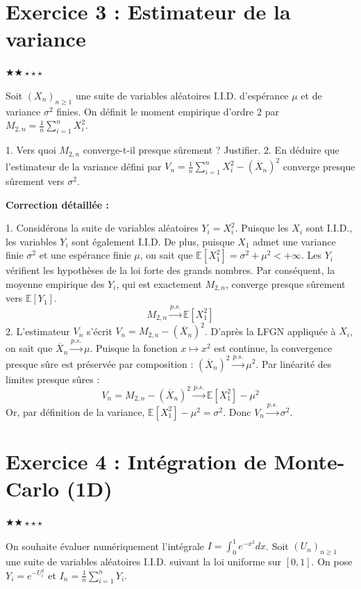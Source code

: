 \documentclass[11pt,a4paper]{article}
\begin{document}
\section*{Exercice 3 : Estimateur de la variance}

$\bigstar\bigstar\star\star\star$

Soit $(X_n)_{n \geq 1}$ une suite de variables aléatoires I.I.D. d'espérance $\mu$ et de variance $\sigma^2$ finies.
On définit le moment empirique d'ordre 2 par $M_{2,n} = \frac{1}{n} \sum_{i=1}^n X_i^2$.

1. Vers quoi $M_{2,n}$ converge-t-il presque sûrement ? Justifier.
2. En déduire que l'estimateur de la variance défini par $V_n = \frac{1}{n} \sum_{i=1}^n X_i^2 - (\overline{X}_n)^2$ converge presque sûrement vers $\sigma^2$.

\textbf{Correction détaillée :}

1. Considérons la suite de variables aléatoires $Y_i = X_i^2$.
   Puisque les $X_i$ sont I.I.D., les variables $Y_i$ sont également I.I.D.
   De plus, puisque $X_1$ admet une variance finie $\sigma^2$ et une espérance finie $\mu$, on sait que $\mathbb{E}[X_1^2] = \sigma^2 + \mu^2 < +\infty$.
   Les $Y_i$ vérifient les hypothèses de la loi forte des grands nombres.
   Par conséquent, la moyenne empirique des $Y_i$, qui est exactement $M_{2,n}$, converge presque sûrement vers $\mathbb{E}[Y_1]$.
   $$ M_{2,n} \xrightarrow{p.s.} \mathbb{E}[X_1^2] $$
2. L'estimateur $V_n$ s'écrit $V_n = M_{2,n} - (\overline{X}_n)^2$.
   D'après la LFGN appliquée à $X_i$, on sait que $\overline{X}_n \xrightarrow{p.s.} \mu$.
   Puisque la fonction $x \mapsto x^2$ est continue, la convergence presque sûre est préservée par composition : $(\overline{X}_n)^2 \xrightarrow{p.s.} \mu^2$.
   Par linéarité des limites presque sûres :
   $$ V_n = M_{2,n} - (\overline{X}_n)^2 \xrightarrow{p.s.} \mathbb{E}[X_1^2] - \mu^2 $$
   Or, par définition de la variance, $\mathbb{E}[X_1^2] - \mu^2 = \sigma^2$.
   Donc $V_n \xrightarrow{p.s.} \sigma^2$.


\section*{Exercice 4 : Intégration de Monte-Carlo (1D)}

$\bigstar\bigstar\star\star\star$

On souhaite évaluer numériquement l'intégrale $I = \int_0^1 e^{-x^2} dx$.
Soit $(U_n)_{n \geq 1}$ une suite de variables aléatoires I.I.D. suivant la loi uniforme sur $[0, 1]$.
On pose $Y_i = e^{-U_i^2}$ et $I_n = \frac{1}{n} \sum_{i=1}^n Y_i$.
\end{document}
